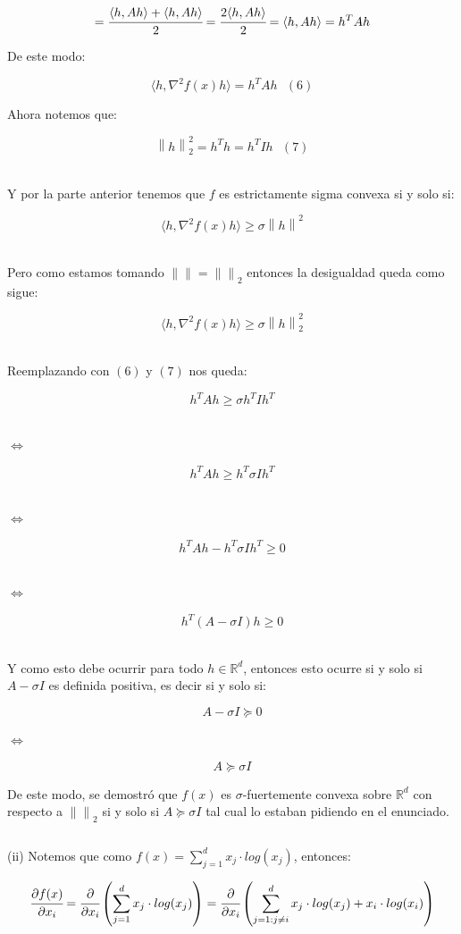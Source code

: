 \documentclass[11pt]{article}
\begin{document}
\[ = \cfrac{\langle h, Ah \rangle + \langle h, A h  \rangle}{2} = \cfrac{2\langle h, Ah \rangle}{2} = \langle h, Ah \rangle = h^T A h  \]

De este modo:

\[ \langle h, \nabla^2 f(x) h \rangle =  h^T A h \ \ \ (6) \]

Ahora notemos que:

\[ \left\| h \right\|_2^{2} = h^T h = h^T I h  \ \ \ (7)  \] \

Y por la parte anterior tenemos que $ f $ es estrictamente sigma convexa si y solo si:

\[ \langle h, \nabla^2 f(x) h \rangle \geq \sigma \left\| h \right\|^2 \] \

Pero como estamos tomando $ \left\|  \right\| = \left\|  \right\|_2 $ entonces la desigualdad queda como sigue:

\[ \langle h, \nabla^2 f(x) h \rangle \geq \sigma \left\| h \right\|_2^2 \] \

Reemplazando con $(6)$ y $(7)$ nos queda: 

\[ h^T A h \geq \sigma h^T I h^T \] \

$ \Leftrightarrow $ \

\[ h^T A h \geq  h^T \sigma I h^T \] \

$ \Leftrightarrow $ \

\[ h^T A h - h^T \sigma I h^T \geq 0    \] \

$ \Leftrightarrow $ \

\[ h^T (A  - \sigma I) h  \geq 0    \] \

Y como esto debe  ocurrir para todo $ h \in \mathbb{R}^{d}$, entonces esto ocurre si y solo si $ A - \sigma I $ es definida positiva, es decir si y solo si:

\[ A - \sigma I \succeq 0 \]

$ \Leftrightarrow $ \

\[ A \succeq \sigma I  \]

De este modo, se demostró que $ f(x) $ es $ \sigma$-fuertemente convexa sobre $ \mathbb{R}^d $ con respecto a $ \left\|  \right\|_2 $ si y solo si $ A \succeq \sigma I $ tal cual lo estaban pidiendo en el enunciado. \\

\hrulefill

$ \ $

(ii) Notemos que como $ f(x) = \sum_{j=1}^{d} x_j \cdot log(x_j) $, entonces:

\[ \cfrac{\partial f(x)}{\partial x_i} = \cfrac{\partial }{\partial x_i} \left( \sum_{j=1}^{d} x_j \cdot log(x_j) \right) = \cfrac{\partial }{\partial x_i} \left( \sum_{j=1: j \neq i}^{d} x_j \cdot log(x_j) + x_i \cdot log(x_i) \right) \] 
\end{document}
